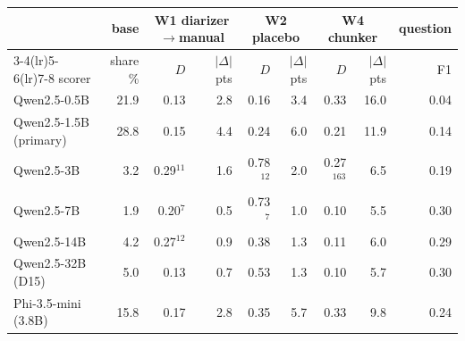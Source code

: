 \begin{tabular}{@{}lrrrrrrrr@{}}
\toprule
& base & \multicolumn{2}{c}{W1 diarizer$\to$manual} & \multicolumn{2}{c}{W2 placebo} & \multicolumn{2}{c}{W4 chunker} & question \\
\cmidrule(lr){3-4}\cmidrule(lr){5-6}\cmidrule(lr){7-8}
scorer & share \% & $D$ & $|\Delta|$ pts & $D$ & $|\Delta|$ pts & $D$ & $|\Delta|$ pts & F1 \\
\midrule
Qwen2.5-0.5B & 21.9 & 0.13 & 2.8 & 0.16 & 3.4 & 0.33 & 16.0 & 0.04 \\
Qwen2.5-1.5B (primary) & 28.8 & 0.15 & 4.4 & 0.24 & 6.0 & 0.21 & 11.9 & 0.14 \\
Qwen2.5-3B & 3.2 & 0.29$^{11}$ & 1.6 & 0.78$^{12}$ & 2.0 & 0.27$^{163}$ & 6.5 & 0.19 \\
Qwen2.5-7B & 1.9 & 0.20$^{7}$ & 0.5 & 0.73$^{7}$ & 1.0 & 0.10 & 5.5 & 0.30 \\
Qwen2.5-14B & 4.2 & 0.27$^{12}$ & 0.9 & 0.38 & 1.3 & 0.11 & 6.0 & 0.29 \\
Qwen2.5-32B (D15) & 5.0 & 0.13 & 0.7 & 0.53 & 1.3 & 0.10 & 5.7 & 0.30 \\
Phi-3.5-mini (3.8B) & 15.8 & 0.17 & 2.8 & 0.35 & 5.7 & 0.33 & 9.8 & 0.24 \\
\bottomrule
\end{tabular}
